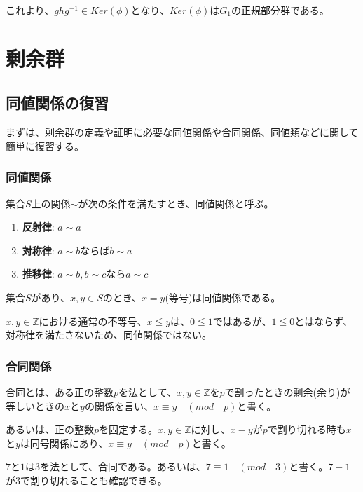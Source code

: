 \documentclass[dvipdfmx,autodetect-engine]{jsarticle}
\begin{document}
これより、$ghg^{-1} \in Ker(\phi)$となり、$Ker(\phi)$は$G_1$の正規部分群である。

\section{剰余群}

\subsection{同値関係の復習}

まずは、剰余群の定義や証明に必要な同値関係や合同関係、同値類などに関して簡単に復習する。

\subsubsection{同値関係}

集合$S$上の関係$\sim$が次の条件を満たすとき、同値関係と呼ぶ。


\begin{enumerate}
\renewcommand{\labelenumi}{(\arabic{enumi})}
\item {\bf 反射律}: $a \sim a$
\item {\bf 対称律}: $a \sim b$ならば$b \sim a$
\item {\bf 推移律}: $a \sim b, b \sim c$なら$a \sim c$
\end{enumerate}

\exam 集合$S$があり、$x, y \in S$のとき、$x = y$(等号)は同値関係である。

\exam $x, y \in \mathbb{Z}$における通常の不等号、$x \leqq y$は、$0 \leqq 1$ではあるが、$1 \leqq 0$とはならず、対称律を満たさないため、同値関係ではない。

\subsubsection{合同関係}

合同とは、ある正の整数$p$を法として、$x,y \in \mathbb{Z}$を$p$で割ったときの剰余(余り)が等しいときの$x$と$y$の関係を言い、$x \equiv y \quad (mod \quad p)$と書く。

あるいは、正の整数$p$を固定する。$x, y \in \mathbb{Z}$に対し、$x - y$が$p$で割り切れる時も$x$と$y$は同号関係にあり、$x \equiv y \quad (mod \quad p)$と書く。

\exam $7$と$1$は$3$を法として、合同である。あるいは、$7 \equiv 1 \quad (mod \quad 3)$と書く。$7 - 1$が$3$で割り切れることも確認できる。
\end{document}
